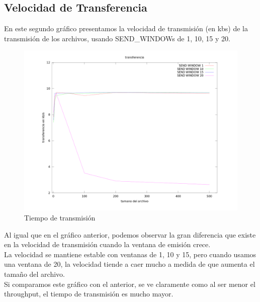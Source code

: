 \subsection{Velocidad de Transferencia}
\indent En este segundo gráfico presentamos la velocidad de transmisión (en kb\/s) de la transmisión de los archivos, usando SEND\_WINDOWs de 1, 10, 15 y 20.

\begin{figure}[h]
  \centering                                                       
          \includegraphics[width=550pt]{./datos/transferencia.png}
          \caption{Tiempo de transmisión}
          \label{fig:vt}
\end{figure}

\clearpage
\indent Al igual que en el gráfico anterior, podemos observar la gran diferencia
que existe en la velocidad de transmisión cuando la ventana de emisión crece.\\
\indent La velocidad se mantiene estable con ventanas de 1,
10 y 15, pero cuando usamos una ventana de 20, la velocidad
tiende a caer mucho a medida de que aumenta el tamaño del archivo.\\
\indent Si comparamos este gráfico con el anterior, se ve claramente como al
ser menor el throughput, el tiempo de transmisión es mucho mayor.\\

